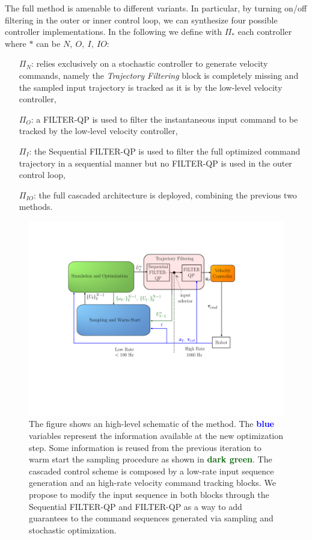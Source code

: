 The full method is amenable to different variants. In particular, by turning on/off filtering in the outer or inner control loop, we can synthesize four possible controller implementations. In the following we define with $\Pi_{*}$ each controller where $*$ can be $N,\ O,\ I,\ IO$:
\begin{itemize}
    \item[$\Pi_{N}$:] relies exclusively on a stochastic controller to generate velocity commands, namely the \textit{Trajectory Filtering} block is completely missing and the sampled input trajectory is tracked as it is by the low-level velocity controller,
    \item[$\Pi_{O}$:] a FILTER-QP is used to filter the instantaneous input command to be tracked by the low-level velocity controller,
    \item[$\Pi_{I}$:] the Sequential FILTER-QP is used to filter the full optimized command trajectory in a sequential manner but no FILTER-QP is used in the outer control loop,
    \item[$\Pi_{IO}$:] the full cascaded architecture is deployed, combining the previous two methods.
\end{itemize}

\begin{figure}[t!]
\centering
\vspace{-0.5cm}
\includegraphics[trim=120 0 50 0, clip, width=0.95\columnwidth] {figures/schemes/receding_horizon_paper.pdf}
\caption{The figure shows an high-level schematic of the method. The \textcolor{blue}{\textbf{blue}} variables represent the information available at the new optimization step. Some information is reused from the previous iteration to warm start the sampling procedure as shown in \textcolor{darkgreen}{\textbf{dark green}}. The cascaded control scheme is composed by a low-rate input sequence generation and an high-rate velocity command tracking blocks. We propose to modify the input sequence in both blocks through the Sequential FILTER-QP and FILTER-QP as a way to add guarantees to the command sequences generated via sampling and stochastic optimization.} \label{fig:block_scheme}
\end{figure}


